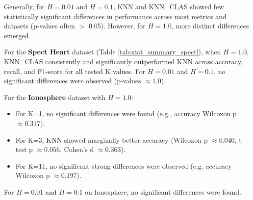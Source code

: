 \documentclass[conference]{IEEEtran}
\begin{document}
Generally, for $H=0.01$ and $H=0.1$, KNN and KNN\_CLAS showed few statistically significant differences in performance across most metrics and datasets (p-values often $>$ 0.05). However, for $H=1.0$, more distinct differences emerged.

\begin{table}[H]
\centering
\caption{Selected Statistical Test Results for Spect Heart (p-values). Negative Cohen's d indicates KNN\_CLAS performed better.}
\label{tab:stat_summary_spect}
\end{table}

For the \textbf{Spect Heart} dataset (Table \ref{tab:stat_summary_spect}), when $H=1.0$, KNN\_CLAS consistently and significantly outperformed KNN across accuracy, recall, and F1-score for all tested K values. For $H=0.01$ and $H=0.1$, no significant differences were observed (p-values $\approx 1.0$).

For the \textbf{Ionosphere} dataset with $H=1.0$:
\begin{itemize}
    \item For K=1, no significant differences were found (e.g., accuracy Wilcoxon p $\approx 0.317$).
    \item For K=3, KNN showed marginally better accuracy (Wilcoxon p $\approx 0.040$, t-test p $\approx 0.056$, Cohen's d $\approx 0.363$).
    \item For K=11, no significant strong differences were observed (e.g. accuracy Wilcoxon p $\approx 0.197$).
\end{itemize}
For $H=0.01$ and $H=0.1$ on Ionosphere, no significant differences were found.
\end{document}
